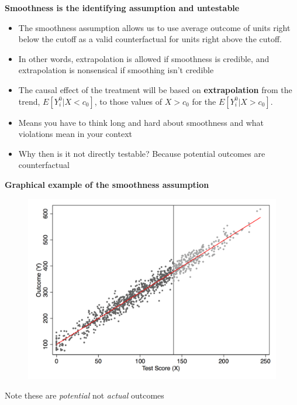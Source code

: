 \documentclass[notes=show]{beamer}
\begin{document}
\begin{frame}[plain]
	\begin{center}
	\textbf{Smoothness is the identifying assumption and untestable}
	\end{center}
	

	\begin{itemize}
	\item The smoothness assumption allows us to use average outcome of units right below the cutoff as a valid counterfactual for units right above the cutoff. 
	\item In other words, extrapolation is allowed if smoothness is credible, and extrapolation is nonsensical if smoothing isn't credible
	\item The causal effect of the treatment will be based on \textbf{extrapolation} from the trend, $E[Y^0_i|X<c_0]$, to those values of $X>c_0$ for the $E[Y^0_i | X>c_0]$.  
	\item Means you have to think long and hard about smoothness and what violations mean in your context
	\item Why then is it not directly testable? Because potential outcomes are counterfactual
	\end{itemize}
	
\end{frame}



\begin{frame}[plain]
	\begin{center}
	\textbf{Graphical example of the smoothness assumption}
	\end{center}

\begin{figure}
\includegraphics[scale=0.3]{./lecture_includes/linear_ex_noe.png}
\end{figure}
Note these are \emph{potential} not \emph{actual} outcomes
\end{frame}
\end{document}

